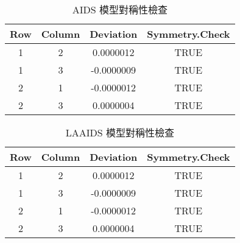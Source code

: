 \begin{table}[H]
    \centering
    \caption{AIDS 模型對稱性檢查} \label{aids-sym}
    \begin{tabular}{cccc}
        \toprule
        Row & Column & Deviation & Symmetry.Check \\
        \midrule
        1 & 2 & 0.0000012 & TRUE \\
        1 & 3 & -0.0000009 & TRUE \\
        2 & 1 & -0.0000012 & TRUE \\
        2 & 3 & 0.0000004 & TRUE \\
        \bottomrule
    \end{tabular}
\end{table}

\begin{table}[H]
    \centering
    \caption{LAAIDS 模型對稱性檢查} \label{laaids-sym}
    \begin{tabular}{cccc}
        \toprule
        Row & Column & Deviation & Symmetry.Check \\
        \midrule
        1 & 2 & 0.0000012 & TRUE \\
        1 & 3 & -0.0000009 & TRUE \\
        2 & 1 & -0.0000012 & TRUE \\
        2 & 3 & 0.0000004 & TRUE \\
        \bottomrule
    \end{tabular}
\end{table}
% 

